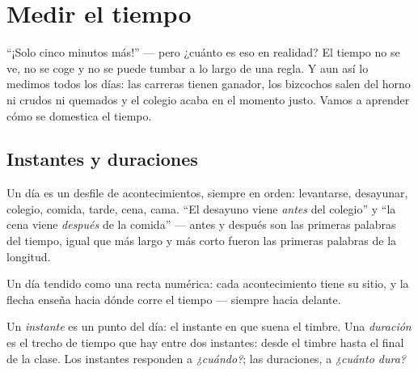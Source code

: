 \chapter{Medir el tiempo}\label{ch:g2:measuring-time}

``¡Solo cinco minutos más!'' --- pero ¿cuánto es eso en realidad? El
tiempo no se ve, no se coge y no se puede tumbar a lo largo de una
regla. Y aun así lo medimos todos los días: las carreras tienen
ganador, los bizcochos salen del horno ni crudos ni quemados y el
colegio acaba en el momento justo. Vamos a aprender cómo se domestica
el tiempo.

\section{Instantes y duraciones}

\begin{example}\label{ex:g2:measuring-time:order}
Un día es un desfile de acontecimientos, siempre en orden:
levantarse, desayunar, colegio, comida, tarde, cena, cama. ``El
desayuno viene \emph{antes} del colegio'' y ``la cena viene
\emph{después} de la comida'' --- antes y después son las primeras
palabras del tiempo, igual que más largo y más corto fueron las
primeras palabras de la longitud.
\end{example}

\begin{omfigure}

{\small Un día tendido como una recta numérica: cada acontecimiento
tiene su sitio, y la flecha enseña hacia dónde corre el tiempo ---
siempre hacia delante.}
\end{omfigure}

\begin{definition}[La duración]\label{def:g2:measuring-time:duration}
Un \emph{instante} es un punto del día: el instante en
que suena el timbre. Una \emph{duración} es el trecho
de tiempo que hay entre dos instantes: desde el timbre hasta el final
de la clase. Los instantes responden a \emph{¿cuándo?}; las
duraciones, a \emph{¿cuánto dura?}
\end{definition}

